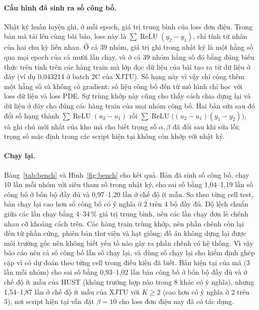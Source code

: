 \paragraph{Cấu hình đã sinh ra số công bố.} Nhật ký huấn luyện ghi, ở mỗi epoch, giá trị trung bình của loss đơn điệu. Trong bản mã tải lên cùng bài báo, loss này là $\sum \operatorname{ReLU}(y_2 - y_1)$, chỉ tính từ nhãn của hai chu kỳ liền nhau. Ở cả 39 nhóm, giá trị ghi trong nhật ký là một hằng số qua mọi epoch của cả mười lần chạy, và ở cả 39 nhóm hằng số đó bằng đúng biểu thức trên tính trên các hàng train mà lớp đọc dữ liệu của bài tạo ra từ dữ liệu ở đây (ví dụ 0{,}043214 ở batch 2C của XJTU). Số hạng này vì vậy chỉ cộng thêm một hằng số và không có gradient: số liệu công bố đến từ mô hình chỉ học với loss dữ liệu và loss PDE. Sự trùng khớp này cũng cho thấy cách chia dựng lại và dữ liệu ở đây cho đúng các hàng train của mọi nhóm công bố. Hai bản sửa sau đó đổi số hạng thành $\sum \operatorname{ReLU}(u_2 - u_1)$ rồi $\sum \operatorname{ReLU}\big((u_2 - u_1)(y_1 - y_2)\big)$, và ghi chú mới nhất của kho mã cho biết trọng số $\alpha, \beta$ đã đổi sau khi sửa lỗi; trọng số mặc định trong các script hiện tại không còn khớp với nhật ký.

\paragraph{Chạy lại.} Bảng~\ref{tab:bench} và Hình~\ref{fig:bench} cho kết quả. Bản đã sinh số công bố, chạy 10 lần mỗi nhóm với siêu tham số trong nhật ký, cho sai số bằng 1{,}04--1{,}19 lần số công bố ở bốn bộ đầy đủ và 0{,}97--1{,}20 lần ở chế độ ít mẫu. So theo từng cell test, bản chạy lại cao hơn số công bố có ý nghĩa ở 2 trên 4 bộ đầy đủ. Độ lệch chuẩn giữa các lần chạy bằng 4--34\,\% giá trị trung bình, nên các lần chạy đơn lẻ chênh nhau cỡ khoảng cách trên. Các hàng train trùng khớp, nên phần chênh còn lại đến từ phần cứng, phiên bản thư viện và hạt giống; đồ án không dựng lại được môi trường gốc nên không biết yếu tố nào gây ra phần chênh có hệ thống. Vì vậy báo cáo nêu cả số công bố lẫn số chạy lại, và dùng số chạy lại cho kiểm định ghép cặp vì có dự đoán theo từng cell trong điều kiện đã biết. Bản hiện tại của mã (3 lần mỗi nhóm) cho sai số bằng 0{,}93--1{,}02 lần bản công bố ở bốn bộ đầy đủ và ở chế độ ít mẫu của HUST (không trường hợp nào trong 8 khác có ý nghĩa), nhưng 1{,}54--1{,}87 lần ở chế độ ít mẫu của XJTU với $K \ge 2$ (cao hơn có ý nghĩa ở 2 trên 3), nơi script hiện tại vẫn đặt $\beta = 10$ cho loss đơn điệu nay đã có tác dụng.

